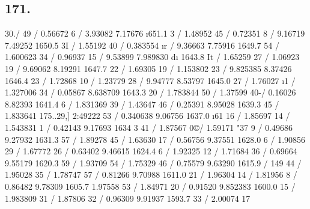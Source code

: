 \documentclass[12pt,a4paper]{article}
\begin{document}
\subsection*{171.}
30./ 49 / 0.56672 6 / 3.93082 7.17676 \i{}651.1 3 / 1.48952 45 / 0.72351 8 / 9.16719 7.49252 1650.5 3I / 1.55192 40 / 0.383554 \i{}r / 9.36663 7.75916 1649.7 54 / 1.600623 34 / 0.96937 15 / 9.53899 7.989830 d\i{} 1643.8 It / 1.65259 27 / 1.06923 19 / 9.69062 8.19291 1647.7 22 / 1.69305 19 / 1.153802 23 / 9.825385 8.37426 1646.4 23 / 1.72868 10 / 1.23779 28 / 9.94777 8.53797 1645.0 27 / 1.76027 \i{}1 /  1.327006 34 / 0.05867 8.638709 1643.3 20 / 1.783844 50 / 1.37599 40-/ 0.16026 8.82393 1641.4 6 / 1.831369 39 / 1.43647 46 / 0.25391 8.95028 1639.3 45 / 1.833641 175..29,] 2:49222 53 / 0.340638 9.06756 1637.0 \i{}61 16 / 1.85697 14 / 1.543831 1 / 0.42143 9.17693 1634 3 41 / 1.87567 0\copyright{}/ 1.59171 "37 9 / 0.49686 9.27932 1631.3 57 / 1.89278 45 / 1.63630 17 / 0.56756 9.37551 1628.0 6 / 1.90856 29 / 1.67772 26 / 0.63402 9.46615 1624.4 6 / 1.92325 12 / 1.71684 36 / 0.69664 9.55179 1620.3 59 / 1.93709 54 / 1.75329 46 / 0.75579 9.63290 1615.9 / 149 44 / 1.95028 35 / 1.78747 57 / 0.81266 9.70988 1611.0 21 / 1.96304 14 / 1.81956 8 / 0.86482 9.78309 1605.7 1.97558 53 / 1.84971 20 / 0.91520 9.852383 1600.0 15 / 1.983809 31 / 1.87806 32 / 0.96309 9.91937 1593.7 33 / 2.00074 17%
\end{document}
